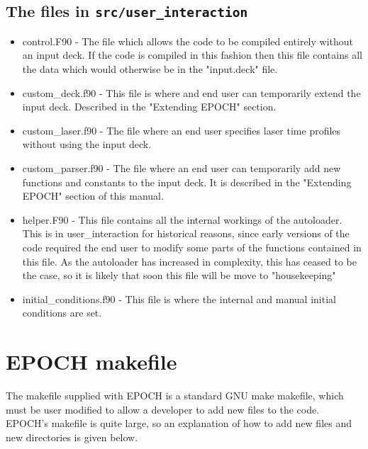 \documentclass[12pt]{article}
\newcommand{\inlinecode}[1]{{\color{warwickred} \bf\texttt{#1}}}
\newcommand{\EPOCH}{{\color{warwickdark}\fontfamily{phv}\selectfont EPOCH} }
\begin{document}
\subsection{The files in \inlinecode{src/user\_interaction}}
\begin{itemize}
\item control.F90 - The file which allows the code to be compiled entirely
  without an input deck. If the code is compiled in this fashion then this
  file contains all the data which would otherwise be in the "input.deck"
  file.
\item custom\_deck.f90 - This file is where and end user can temporarily
  extend the input deck. Described in the "Extending EPOCH" section.
\item custom\_laser.f90 - The file where an end user specifies laser time
  profiles without using the input deck.
\item custom\_parser.f90 - The file where an end user can temporarily add new
  functions and constants to the input deck. It is described in the "Extending
  EPOCH" section of this manual.
\item helper.F90 - This file contains all the internal workings of the
  autoloader. This is in user\_interaction for historical reasons, since early
  versions of the code required the end user to modify some parts of the
  functions contained in this file. As the autoloader has increased in
  complexity, this has ceased to be the case, so it is likely that soon this
  file will be move to "housekeeping"
\item initial\_conditions.f90 - This file is where the internal and manual
  initial conditions are set.
\end{itemize}

\section{\EPOCH makefile}
The makefile supplied with \EPOCH is a standard GNU make makefile, which must
be user modified to allow a developer to add new files to the code. EPOCH's
makefile is quite large, so an explanation of how to add new files and new
directories is given below.
\end{document}
